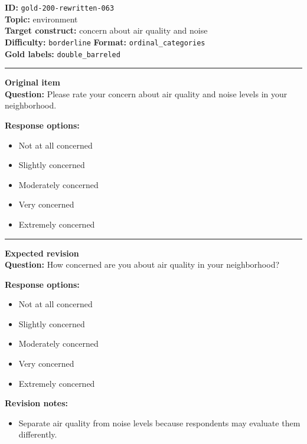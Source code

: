 \documentclass[10pt,a4paper]{article}
\newcommand{\sectionline}{\vspace{0.15em}\hrule\vspace{0.35em}}
\begin{document}
\begin{tcolorbox}[colframe=FlawRed,colback=white,colbacktitle=FlawRed!9,coltitle=black,title={Item 063\hfill Flawed item}]
\textbf{ID:} \texttt{gold-200-rewritten-063}\\
\textbf{Topic:} environment\\
\textbf{Target construct:} concern about air quality and noise\\
\textbf{Difficulty:} \texttt{borderline} \quad \textbf{Format:} \texttt{ordinal\_categories}\\
\textbf{Gold labels:} \texttt{double\_barreled}\\
\sectionline
\textbf{Original item}\\
\textbf{Question:} Please rate your concern about air quality and noise levels in your neighborhood.
\par\textbf{Response options:}
\begin{itemize}
\item Not at all concerned
\item Slightly concerned
\item Moderately concerned
\item Very concerned
\item Extremely concerned
\end{itemize}
\sectionline
\textbf{Expected revision}\\
\textbf{Question:} How concerned are you about air quality in your neighborhood?
\par\textbf{Response options:}
\begin{itemize}
\item Not at all concerned
\item Slightly concerned
\item Moderately concerned
\item Very concerned
\item Extremely concerned
\end{itemize}
\par\textbf{Revision notes:}
\begin{itemize}
\item Separate air quality from noise levels because respondents may evaluate them differently.
\end{itemize}
\end{tcolorbox}
\end{document}
